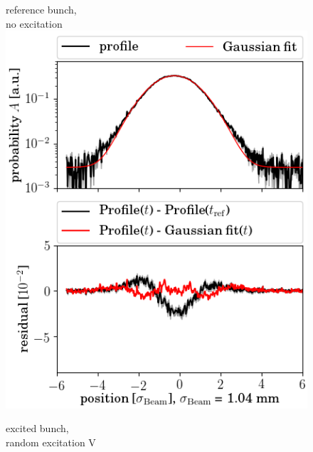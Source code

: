\documentclass[%
 reprint,
 amsmath,amssymb,
 aps,
prstab,
]{revtex4-1}
\begin{document}
\begin{figure}[h]
	\begin{minipage}[t]{0.49\linewidth}
		\centering
		reference bunch,\\ no excitation
		\includegraphics[width=1.0\linewidth]{profile_v_ranv_slot_1698.png}
	\end{minipage}
	\begin{minipage}[t]{0.49\linewidth}
		\centering
		excited bunch,\\ random excitation V

\end{minipage}
\end{figure}
\end{document}
